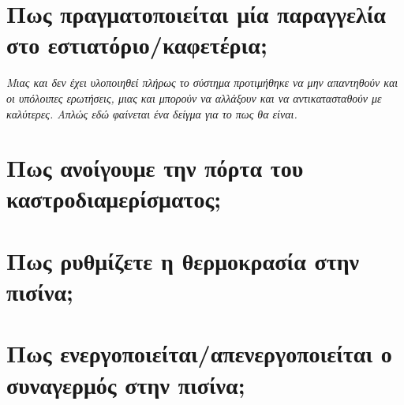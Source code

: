 \documentclass[a4paper,titlepage,twoside,12pt,leqno]{article}
\begin{document}
\section{Πως πραγματοποιείται μία παραγγελία στο εστιατόριο/καφετέρια;}

\emph{Μιας και δεν έχει υλοποιηθεί πλήρως το σύστημα προτιμήθηκε να μην απαντηθούν και οι υπόλοιπες ερωτήσεις, μιας και μπορούν να αλλάξουν και να αντικατασταθούν με καλύτερες. Απλώς εδώ φαίνεται ένα δείγμα για το πως θα είναι.}

\section{Πως ανοίγουμε την πόρτα του καστροδιαμερίσματος;}

\section{Πως ρυθμίζετε η θερμοκρασία στην πισίνα;}

\section{Πως ενεργοποιείται/απενεργοποιείται ο συναγερμός στην πισίνα;}
\end{document}
